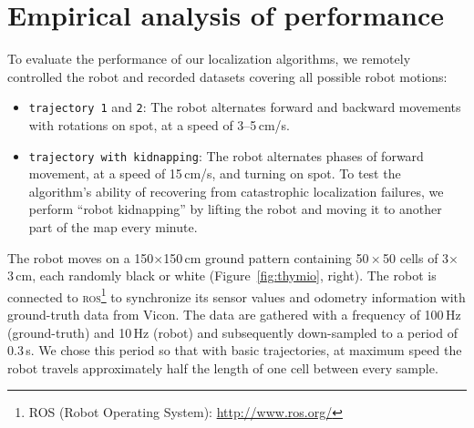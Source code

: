 \documentclass{svmult}
\newcommand{\fig}[1]{Figure~\ref{fig:#1}}
\begin{document}
\section{Empirical analysis of performance}


To evaluate the performance of our localization algorithms, we remotely controlled the robot and recorded datasets covering all possible robot motions:
\begin{itemize}
\item \texttt{trajectory 1} and \texttt{2}: The robot alternates forward and backward movements with rotations on spot, at a speed of 3--5\,cm/s. %
\item \texttt{trajectory with kidnapping}: The robot alternates phases of forward movement, at a speed of 15\,cm/s, and turning on spot.
To test the algorithm's ability of recovering from catastrophic localization failures, we perform ``robot kidnapping'' by lifting the robot and moving it to another part of the map every minute.
\end{itemize}
The robot moves on a 150$\times$150\,cm ground pattern containing 50\,$\times$\,50 cells of 3$\times$3\,cm, each randomly black or white (\fig{thymio}, right).
The robot is connected to \textsc{ros}\footnote{ROS (Robot Operating System): \url{http://www.ros.org/}} to synchronize its sensor values and odometry information with ground-truth data from Vicon.
The data are gathered with a frequency of 100\,Hz (ground-truth) and 10\,Hz (robot) and subsequently down-sampled to a period of 0.3\,s.
We chose this period so that with basic trajectories, at maximum speed the robot travels approximately half the length of one cell between every sample.

\label{sec:mle}
\end{document}

